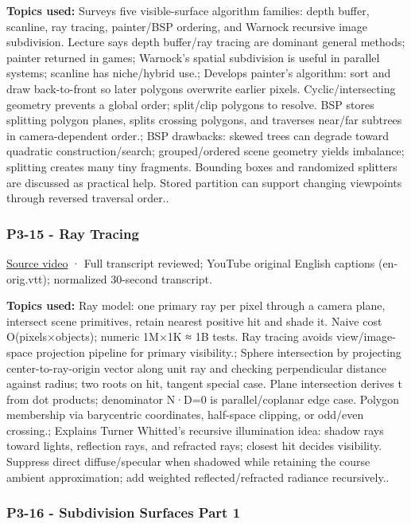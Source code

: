\textbf{Topics used:} Surveys five visible-surface algorithm families: depth buffer, scanline, ray tracing, painter/BSP ordering, and Warnock recursive image subdivision. Lecture says depth buffer/ray tracing are dominant general methods; painter returned in games; Warnock's spatial subdivision is useful in parallel systems; scanline has niche/hybrid use.; Develops painter's algorithm: sort and draw back-to-front so later polygons overwrite earlier pixels. Cyclic/intersecting geometry prevents a global order; split/clip polygons to resolve. BSP stores splitting polygon planes, splits crossing polygons, and traverses near/far subtrees in camera-dependent order.; BSP drawbacks: skewed trees can degrade toward quadratic construction/search; grouped/ordered scene geometry yields imbalance; splitting creates many tiny fragments. Bounding boxes and randomized splitters are discussed as practical help. Stored partition can support changing viewpoints through reversed traversal order..

\subsubsection{P3-15 - Ray Tracing}\label{04-visual-computing-ii-ch036-p3-15---ray-tracing}

\href{https://www.youtube.com/watch?v=Ahp6LDQnK4Y}{Source video} · Full transcript reviewed; YouTube original English captions (en-orig.vtt); normalized 30-second transcript.

\textbf{Topics used:} Ray model: one primary ray per pixel through a camera plane, intersect scene primitives, retain nearest positive hit and shade it. Naive cost O(pixels×objects); numeric 1M×1K ≈ 1B tests. Ray tracing avoids view/image-space projection pipeline for primary visibility.; Sphere intersection by projecting center-to-ray-origin vector along unit ray and checking perpendicular distance against radius; two roots on hit, tangent special case. Plane intersection derives t from dot products; denominator N·D=0 is parallel/coplanar edge case. Polygon membership via barycentric coordinates, half-space clipping, or odd/even crossing.; Explains Turner Whitted's recursive illumination idea: shadow rays toward lights, reflection rays, and refracted rays; closest hit decides visibility. Suppress direct diffuse/specular when shadowed while retaining the course ambient approximation; add weighted reflected/refracted radiance recursively..

\subsubsection{P3-16 - Subdivision Surfaces Part 1}\label{04-visual-computing-ii-ch036-p3-16---subdivision-surfaces-part-1}

